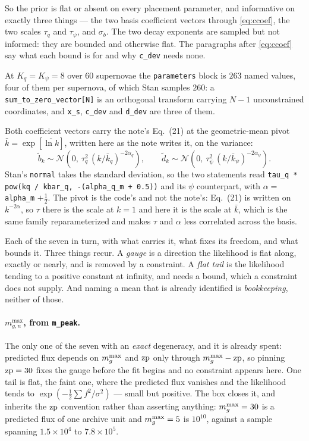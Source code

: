 \documentclass[11pt]{article}
\newcommand{\code}[1]{\texttt{#1}}
\begin{document}
So the prior is flat or absent on every placement parameter, and informative on exactly
three things --- the two basis coefficient vectors through \eqref{eq:ccoef}, the two scales
$\tau_{q}$ and $\tau_{\psi}$, and $\sigma_{b}$. The two decay exponents are sampled but not
informed: they are bounded and otherwise flat. The paragraphs after \eqref{eq:ccoef} say what each
bound is for and why \code{c\_dev} needs none.

At $K_{q} = K_{\psi} = 8$ over $60$ supernovae the \code{parameters} block is $263$ named
values, four of them per supernova, of which Stan samples $260$: a
\code{sum\_to\_zero\_vector[N]} is an orthogonal transform carrying $N-1$ unconstrained
coordinates, and \code{x\_s}, \code{c\_dev} and \code{d\_dev} are three of them.

\medskip\noindent
Both coefficient vectors carry the note's Eq.~(21) at the geometric-mean pivot
$\bar k = \exp[\overline{\ln k}]$, written here as the note writes it, on the variance:
\begin{equation}
  \tilde b_{k} \sim \mathcal{N}\!\left(0,\ \tau_{q}^{2}\,(k/\bar k_{q})^{-2\alpha_{q}}\right) ,
  \qquad
  \tilde d_{k} \sim \mathcal{N}\!\left(0,\ \tau_{\psi}^{2}\,(k/\bar k_{\psi})^{-2\alpha_{\psi}}\right) .
  \label{eq:ccoef}
\end{equation}
Stan's \code{normal} takes the standard deviation, so the two statements read
\code{tau\_q * pow(kq / kbar\_q, -(alpha\_q\_m + 0.5))} and its $\psi$ counterpart, with
$\alpha = $ \code{alpha\_m} $+ \frac12$. The pivot is the code's and not the note's: Eq.~(21)
is written on $k^{-2\alpha}$, so $\tau$ there is the scale at $k = 1$ and here it is the
scale at $\bar k$, which is the same family reparameterized and makes $\tau$ and $\alpha$
less correlated across the basis.

Each of the seven in turn, with what carries it, what fixes its freedom, and what bounds
it. Three things recur. A \emph{gauge} is a direction the likelihood is flat along, exactly
or nearly, and is removed by a constraint. A \emph{flat tail} is the likelihood tending to a
positive constant at infinity, and needs a bound, which a constraint does not supply. And
naming a mean that is already identified is \emph{bookkeeping}, neither of those.

\paragraph{$m_{g,n}^{\max}$, from \code{m\_peak}.} The only one of the seven with an
\emph{exact} degeneracy, and it is already spent: predicted flux depends on $m_{g}^{\max}$ and
$\mathrm{zp}$ only through $m_{g}^{\max} - \mathrm{zp}$, so pinning $\mathrm{zp} = 30$ fixes the gauge before the fit
begins and no constraint appears here. One tail is flat, the faint one, where the predicted
flux vanishes and the likelihood tends to $\exp(-\frac12\sum f^{2}/\sigma^{2})$ --- small
but positive. The box closes it, and inherits the $\mathrm{zp}$ convention rather than asserting
anything: $m_{g}^{\max} = 30$ is a predicted flux of one archive unit and $m_{g}^{\max} = 5$ is
$10^{10}$, against a sample spanning $1.5\times10^{4}$ to $7.8\times10^{5}$.
\end{document}
